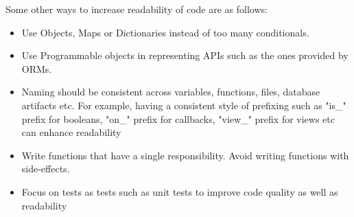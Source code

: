 Some other ways to increase readability of code are as follows:

\begin{itemize}
  \item Use Objects, Maps or Dictionaries instead of too many conditionals.
  \item Use Programmable objects in representing APIs such as the ones provided by ORMs.
  \item Naming should be consistent across variables, functions, files, database artifacts etc. For example, having a consistent style of prefixing such as "is\_" prefix for booleans, "on\_" prefix for callbacks, "view\_" prefix for views etc can enhance readability 
  \item Write functions that have a single responsibility. Avoid writing functions with side-effects.
  \item Focus on tests as tests such as unit tests to improve code quality as well as readability
\end{itemize}


